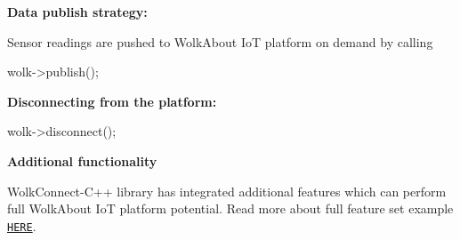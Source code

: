 {\bfseries Data publish strategy\+:}

Sensor readings are pushed to Wolk\+About IoT platform on demand by calling 
\begin{DoxyCode}
wolk->publish();
\end{DoxyCode}


{\bfseries Disconnecting from the platform\+:} 
\begin{DoxyCode}
wolk->disconnect();
\end{DoxyCode}
 {\bfseries Additional functionality}

Wolk\+Connect-\/\+C++ library has integrated additional features which can perform full Wolk\+About IoT platform potential. Read more about full feature set example \href{./examples/full_feature_set/}{\tt H\+E\+RE}. 